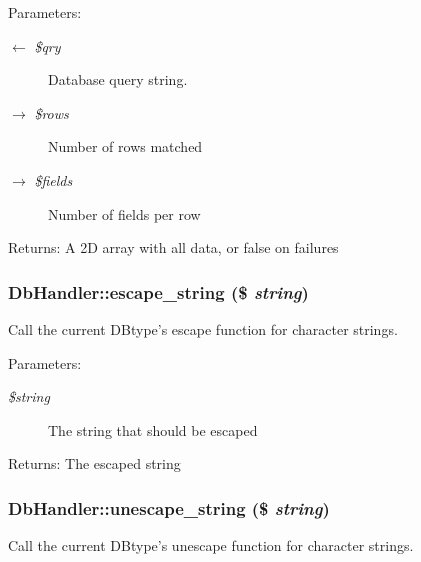 \begin{Desc}
\item[Parameters:]
\begin{description}
\item[\mbox{$\leftarrow$} {\em \$qry}]Database query string. \item[\mbox{$\rightarrow$} {\em \$rows}]Number of rows matched \item[\mbox{$\rightarrow$} {\em \$fields}]Number of fields per row \end{description}
\end{Desc}
\begin{Desc}
\item[Returns:]A 2D array with all data, or false on failures \end{Desc}
\hypertarget{classDbHandler_67d77702ff6db70f89123d3f947af143}{
\subsubsection{\setlength{\rightskip}{0pt plus 5cm}DbHandler::escape\_\-string (\$ {\em string})}}
\label{classDbHandler_67d77702ff6db70f89123d3f947af143}


Call the current DBtype's escape function for character strings.

\begin{Desc}
\item[Parameters:]
\begin{description}
\item[{\em \$string}]The string that should be escaped \end{description}
\end{Desc}
\begin{Desc}
\item[Returns:]The escaped string \end{Desc}
\hypertarget{classDbHandler_27c604b14c39913d34630e5504979b15}{
\subsubsection{\setlength{\rightskip}{0pt plus 5cm}DbHandler::unescape\_\-string (\$ {\em string})}}
\label{classDbHandler_27c604b14c39913d34630e5504979b15}


Call the current DBtype's unescape function for character strings.

